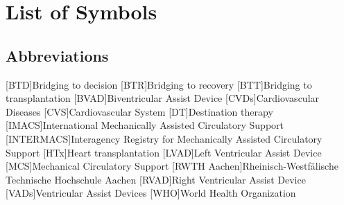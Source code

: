 \chapter*{List of Symbols}										%



\section*{Abbreviations}
%
[BTD]{Bridging to decision}
[BTR]{Bridging to recovery}
[BTT]{Bridging to transplantation}
[BVAD]{Biventricular Assist Device}
[CVDs]{Cardiovascular Diseases}
[CVS]{Cardiovascular System}
[DT]{Destination therapy}
[IMACS]{International Mechanically Assisted Circulatory Support}
[INTERMACS]{Interagency Registry for Mechanically Assisted Circulatory Support}
[HTx]{Heart transplantation}
[LVAD]{Left Ventricular Assist Device}
[MCS]{Mechanical Circulatory Support}
[RWTH Aachen]{Rheinisch-Westf{\"a}lische Technische Hochschule Aachen}
[RVAD]{Right Ventricular Assist Device}
[VADs]{Ventricular Assist Devices}
[WHO]{World Health Organization}


